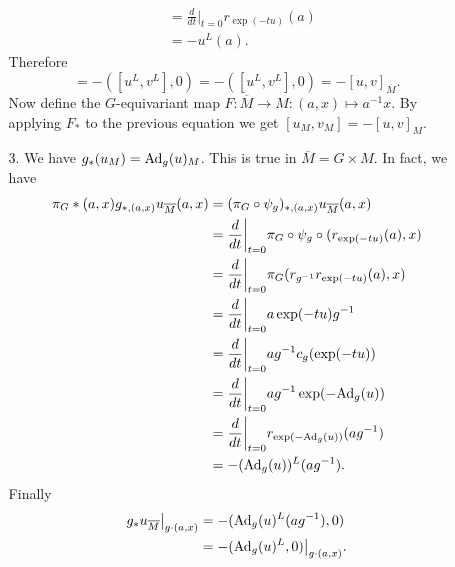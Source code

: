 \begin{itemize}
\begin{itemize}
\begin{equation}
\begin{split}
                    &=\frac{d}{dt}\bigg|_{t=0}r_{\exp(-tu)}(a)\\
                    &=-u^L(a).
                \end{split}
            \end{equation}
            Therefore
            \begin{equation}
                [u_{\overline{M}},v_{\overline{M}}]=
                -([u^L,v^L],0)=
                -([u^L,v^L],0)=
                -[u,v]_{\overline{M}}.
            \end{equation}
            Now define the $G$-equivariant map $F:\overline{M}\to M:(a,x)\mapsto a^{-1}x$. By applying $F_*$ to the previous 
            equation we get $[u_M,v_M]=-[u,v]_M$.
            \item[3.] We have $g_*(u_M)=\text{Ad}_g(u)_M$. This is true in $\overline{M}=G\times M$. In fact, we have 
            \begin{equation}
                \begin{split}
                    \pi_G*(a,x)g_{*,(a,x)}u_{\overline{M}}(a,x)
                    &=(\pi_G\circ\psi_g)_{*,(a,x)}u_{\overline{M}}(a,x)\\
                    &=\frac{d}{dt}\bigg|_{t=0}\pi_G\circ\psi_g\circ(r_{\exp(-tu)}(a),x)\\
                    &=\frac{d}{dt}\bigg|_{t=0}\pi_G(r_{g^{-1}}r_{\exp(-tu)}(a),x)\\
                    &=\frac{d}{dt}\bigg|_{t=0}a\exp(-tu)g^{-1}\\
                    &=\frac{d}{dt}\bigg|_{t=0}ag^{-1}c_g(\exp(-tu))\\
                    &=\frac{d}{dt}\bigg|_{t=0}ag^{-1}\exp(-\text{Ad}_g(u))\\
                    &=\frac{d}{dt}\bigg|_{t=0}r_{\exp(-\text{Ad}_g(u))}(ag^{-1})\\
                    &=-(\text{Ad}_g(u))^L(ag^{-1}).
                \end{split}
            \end{equation}
            Finally 
            \begin{equation}
                \begin{split}
                    g_*u_{\overline{M}}\big|_{g\cdot(a,x)}&=-(\text{Ad}_g(u)^L(ag^{-1}),0)\\
                    &=-(\text{Ad}_g(u)^L,0)\big|_{g\cdot(a,x)}.
                \end{split}
            \end{equation}
        \end{itemize}

\end{itemize}
